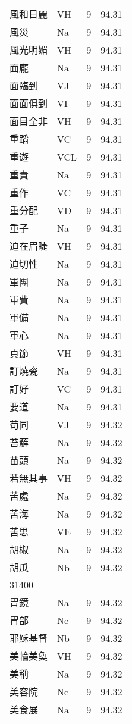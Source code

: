 \documentclass[twocolumn]{book}
\begin{document}
\begin{supertabular}{llrr}
風和日麗 & VH & 9 &  94.31\\
風災 & Na & 9 &  94.31\\
風光明媚 & VH & 9 &  94.31\\
面龐 & Na & 9 &  94.31\\
面臨到 & VJ & 9 &  94.31\\
面面俱到 & VI & 9 &  94.31\\
面目全非 & VH & 9 &  94.31\\
重蹈 & VC & 9 &  94.31\\
重遊 & VCL & 9 &  94.31\\
重責 & Na & 9 &  94.31\\
重作 & VC & 9 &  94.31\\
重分配 & VD & 9 &  94.31\\
重子 & Na & 9 &  94.31\\
迫在眉睫 & VH & 9 &  94.31\\
迫切性 & Na & 9 &  94.31\\
軍團 & Na & 9 &  94.31\\
軍費 & Na & 9 &  94.31\\
軍備 & Na & 9 &  94.31\\
軍心 & Na & 9 &  94.31\\
貞節 & VH & 9 &  94.31\\
訂燒瓷 & Na & 9 &  94.31\\
訂好 & VC & 9 &  94.31\\
要道 & Na & 9 &  94.31\\
苟同 & VJ & 9 &  94.32\\
苔蘚 & Na & 9 &  94.32\\
苗頭 & Na & 9 &  94.32\\
若無其事 & VH & 9 &  94.32\\
苦處 & Na & 9 &  94.32\\
苦海 & Na & 9 &  94.32\\
苦思 & VE & 9 &  94.32\\
胡椒 & Na & 9 &  94.32\\
胡瓜 & Nb & 9 &  94.32\\
31400\\
胃鏡 & Na & 9 &  94.32\\
胃部 & Nc & 9 &  94.32\\
耶穌基督 & Nb & 9 &  94.32\\
美輪美奐 & VH & 9 &  94.32\\
美稱 & Na & 9 &  94.32\\
美容院 & Nc & 9 &  94.32\\
美食展 & Na & 9 &  94.32\\

\end{supertabular}
\end{document}
